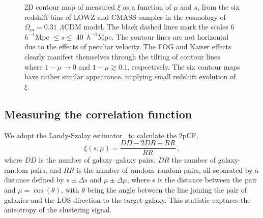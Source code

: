 \documentclass[iop]{emulateapj}
\begin{document}
\begin{figure*}
   \centering{
   }
   \caption{
    \label{fig_2pcfcon} 
    2D contour map of measured $\xi$ as a function of $\mu$ and $s$, from the six redshift bins of LOWZ and CMASS samples 
      in the cosmology of $\Omega_m=0.31$ $\Lambda$CDM model.
    The black dashed lines mark the scales 6\ $h^{-1}$Mpc $\leq s\leq$ 40\ $h^{-1}$Mpc.
    The contour lines are not horizontal due to the effects of peculiar velocity.
    The FOG and Kaiser effects clearly manifest themselves through the tilting of contour 
     lines where $1-\mu \rightarrow 0$ and $1-\mu \gtrsim0.1$, respectively.
    The six contour maps have rather similar appearance, implying small redshift evolution of $\xi$.
   }
\end{figure*}

\subsection{Measuring the correlation function}

We adopt the Landy-Szalay estimator~\citep{1993ApJ...412...64L} to calculate the 2pCF,
\begin{equation}
\xi(s,\mu)=\frac{DD-2DR+RR}{RR}\ ,
\end{equation}
where $DD$ is the number of galaxy--galaxy pairs, 
$DR$ the number of galaxy-random pairs, 
and $RR$ is the number of random--random pairs, 
all separated by a distance defined by $s\pm\Delta s$ and $\mu\pm\Delta\mu$, 
where $s$ is the distance between the pair and $\mu=\cos(\theta)$, 
with $\theta$ being the angle between the line joining the pair of galaxies and the LOS direction to the target galaxy. 
This statistic captures the anisotropy of the clustering signal.
\end{document}
